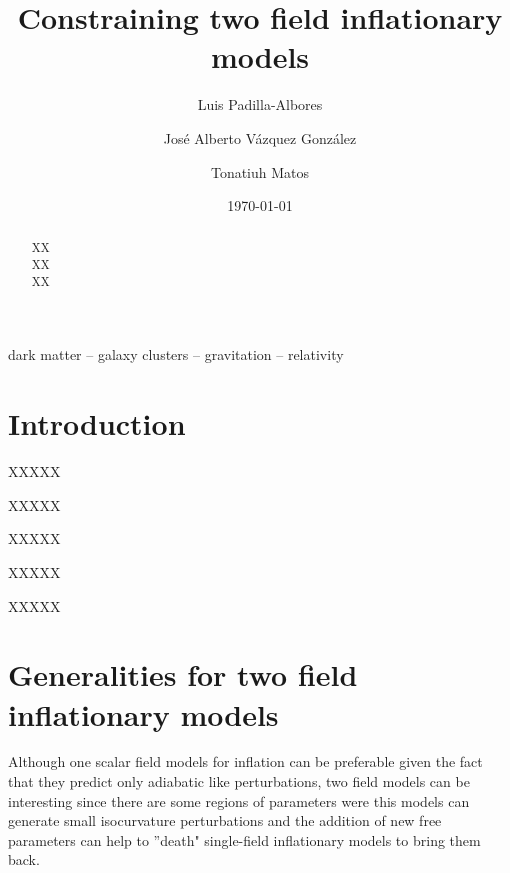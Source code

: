 \documentclass[twocolumn,           %
               showpacs,            %
               preprintnumbers,     %
               aps,                 %
               prl,          	    %
               letterpaper,             %
               superscriptaddress,      %
               nofootinbib,         %
               tightenlines,        %
               floats,floatfix      %
               ,usenatbib,
               ]{revtex4-1}
\begin{document}
\title{Constraining two field inflationary models}
\author{Luis Padilla-Albores}  
   \author{Jos\'e Alberto V\'azquez Gonz\'alez}  
\author{Tonatiuh Matos}  
\date{\today}

\begin{abstract}
XX\\
XX\\
XX\\

\end{abstract}
\begin{keywords}
dark matter  -- galaxy clusters --  gravitation  -- relativity
\end{keywords}

\maketitle



\section{Introduction}
\label{introduction}

XXXXX

XXXXX

XXXXX

XXXXX

XXXXX

\section{Generalities for two field inflationary models}

Although one scalar field models for inflation can be preferable given the fact that they predict only adiabatic like perturbations, two field models can be interesting since there are some regions of parameters were this models can generate small isocurvature perturbations and the addition of new free parameters can help to ''death" single-field inflationary models to bring them back.  
\end{document}
